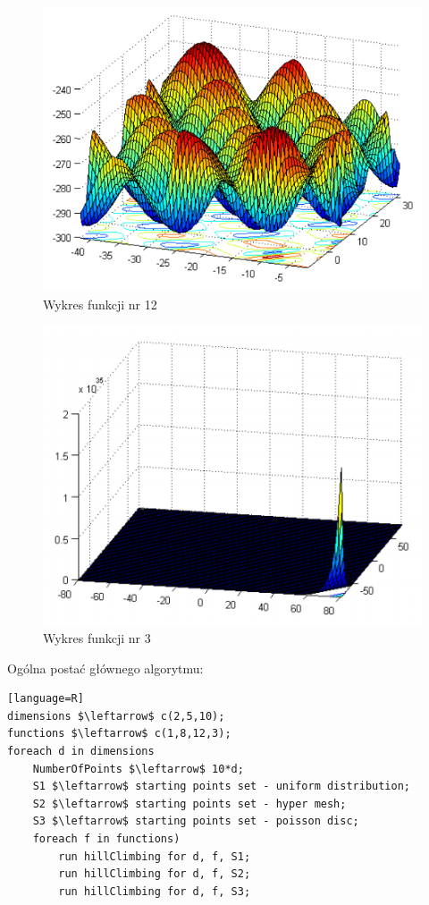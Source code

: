 \documentclass{article}
\begin{document}
\begin{figure}[H]
\centering
\includegraphics[scale=0.6]{12}
\caption{Wykres funkcji nr 12}
\end{figure}


\begin{figure}[H]
\centering
\includegraphics[scale=0.7]{3}
\caption{Wykres funkcji nr 3}
\end{figure}
\newpage
Ogólna postać głównego algorytmu:\\
\begin{lstlisting}[mathescape][language=R]
dimensions $\leftarrow$ c(2,5,10);
functions $\leftarrow$ c(1,8,12,3);
foreach d in dimensions
    NumberOfPoints $\leftarrow$ 10*d;
    S1 $\leftarrow$ starting points set - uniform distribution;
    S2 $\leftarrow$ starting points set - hyper mesh;
    S3 $\leftarrow$ starting points set - poisson disc;
    foreach f in functions)
        run hillClimbing for d, f, S1;
        run hillClimbing for d, f, S2;
        run hillClimbing for d, f, S3;
\end{lstlisting}
\end{document}
